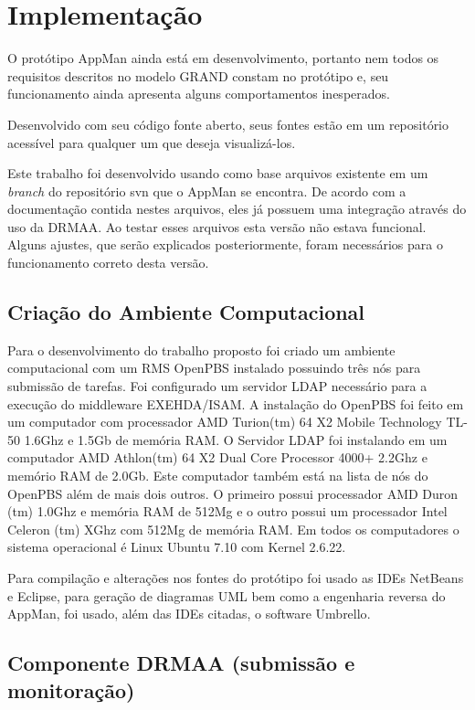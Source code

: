 \chapter{Implementação}
\label{cap:implementacao}

O protótipo AppMan ainda está em desenvolvimento, portanto nem todos os requisitos descritos no modelo GRAND constam no protótipo e, seu funcionamento ainda apresenta alguns comportamentos inesperados. 

Desenvolvido com seu código fonte aberto, seus fontes estão em um repositório acessível para qualquer um que deseja visualizá-los.

Este trabalho foi desenvolvido usando como base arquivos existente em um \emph{branch} do repositório svn que o AppMan se encontra. De acordo com a documentação contida nestes arquivos, eles já possuem uma integração através do uso da DRMAA. Ao testar esses arquivos esta versão não estava funcional. Alguns ajustes, que serão explicados posteriormente, foram necessários para o funcionamento correto desta versão.

\section{Criação do Ambiente Computacional}

Para o desenvolvimento do trabalho proposto foi criado um ambiente computacional com um RMS OpenPBS instalado possuindo três nós para submissão de tarefas. Foi configurado um servidor LDAP necessário para a execução do middleware EXEHDA/ISAM. A instalação do OpenPBS foi feito em um computador com processador AMD Turion(tm) 64 X2 Mobile Technology TL-50 1.6Ghz e 1.5Gb de memória RAM. O Servidor LDAP foi instalando em um computador AMD Athlon(tm) 64 X2 Dual Core Processor 4000+ 2.2Ghz e memório RAM de 2.0Gb. Este computador também está na lista de nós do OpenPBS além de mais dois outros. O primeiro possui processador AMD Duron (tm) 1.0Ghz e memória RAM de 512Mg e o outro possui um processador Intel Celeron (tm) XGhz com 512Mg de memória RAM. Em todos os computadores o sistema operacional é Linux Ubuntu 7.10 com Kernel 2.6.22.

Para compilação e alterações nos fontes do protótipo foi usado as IDEs NetBeans\cite{netbeans} e Eclipse\cite{eclipse}, para geração de diagramas UML bem como a engenharia reversa do AppMan, foi usado, além das IDEs citadas, o software Umbrello\cite{umbrello}.

\section{Componente DRMAA (submissão e monitoração)}

